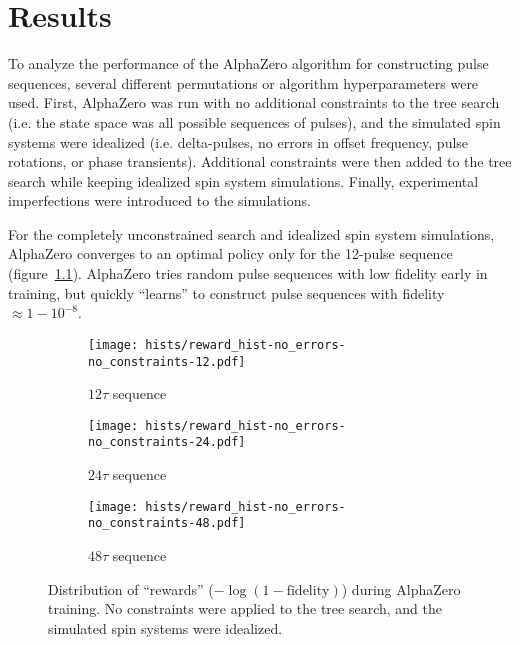 \chapter{Results}

To analyze the performance of the AlphaZero algorithm for constructing pulse sequences, several different permutations or algorithm hyperparameters were used. First, AlphaZero was run with no additional constraints to the tree search (i.e. the state space was all possible sequences of pulses), and the simulated spin systems were idealized (i.e. delta-pulses, no errors in offset frequency, pulse rotations, or phase transients). Additional constraints were then added to the tree search while keeping idealized spin system simulations. Finally, experimental imperfections were introduced to the simulations.


For the completely unconstrained search and idealized spin system simulations, AlphaZero converges to an optimal
policy only for the 12-pulse sequence (figure~\ref{fig:reward_hist-no_errors-no_constraints-12}). AlphaZero tries random pulse sequences with low fidelity early in training, but quickly ``learns'' to construct pulse sequences with fidelity $\approx 1 - 10^{-8}$.

\begin{figure}[H]
    \centering
    \begin{subfigure}{.49\textwidth}
        \centering
        \texttt{[image: hists/reward\_hist-no\_errors-no\_constraints-12.pdf]}
        \caption{$12\tau$ sequence}
        \label{fig:reward_hist-no_errors-no_constraints-12}
    \end{subfigure}
    \begin{subfigure}{.49\textwidth}
        \centering
        \texttt{[image: hists/reward\_hist-no\_errors-no\_constraints-24.pdf]}
        \caption{$24\tau$ sequence}
        \label{fig:reward_hist-no_errors-no_constraints-24}
    \end{subfigure}
    \begin{subfigure}{.49\textwidth}
        \centering
        \texttt{[image: hists/reward\_hist-no\_errors-no\_constraints-48.pdf]}
        \caption{$48\tau$ sequence}
        \label{fig:reward_hist-no_errors-no_constraints-48}
    \end{subfigure}
    \caption{Distribution of ``rewards'' ($-\log(1 - \text{fidelity})$) during AlphaZero training. No constraints were applied to the tree search, and the simulated spin systems were idealized.}
    \label{fig:reward_hist-no_errors-no_constraints}
\end{figure}

